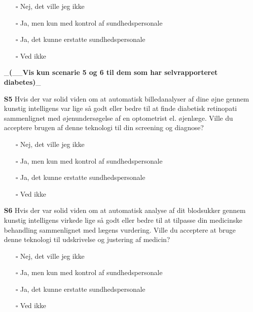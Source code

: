 \documentclass[
]{article}
\providecommand{\tightlist}{%
  \setlength{\itemsep}{0pt}\setlength{\parskip}{0pt}}
\begin{document}
\begin{itemize}
\tightlist
\item[$\square$]
  Nej, det ville jeg ikke
\item[$\square$]
  Ja, men kun med kontrol af sundhedspersonale
\item[$\square$]
  Ja, det kunne erstatte sundhedspersonale
\item[$\square$]
  Ved ikke
\end{itemize}

\_\textbf{(}\_\_\textbf{Vis kun scenarie 5 og 6 til dem som har
selvrapporteret diabetes)}\_

\textbf{S5} Hvis der var solid viden om at automatisk billedanalyser af
dine øjne gennem kunstig intelligens var lige så godt eller bedre til at
finde diabetisk retinopati sammenlignet med øjenundersøgelse af en
optometrist el. øjenlæge. Ville du acceptere brugen af denne teknologi
til din screening og diagnose?

\begin{itemize}
\tightlist
\item[$\square$]
  Nej, det ville jeg ikke
\item[$\square$]
  Ja, men kun med kontrol af sundhedspersonale
\item[$\square$]
  Ja, det kunne erstatte sundhedspersonale
\item[$\square$]
  Ved ikke
\end{itemize}

\textbf{S6} Hvis der var solid viden om at automatisk analyse af dit
blodsukker gennem kunstig intelligens virkede lige så godt eller bedre
til at tilpasse din medicinske behandling sammenlignet med lægens
vurdering. Ville du acceptere at bruge denne teknologi til udskrivelse
og justering af medicin?

\begin{itemize}
\tightlist
\item[$\square$]
  Nej, det ville jeg ikke
\item[$\square$]
  Ja, men kun med kontrol af sundhedspersonale
\item[$\square$]
  Ja, det kunne erstatte sundhedspersonale
\item[$\square$]
  Ved ikke
\end{itemize}
\end{document}
